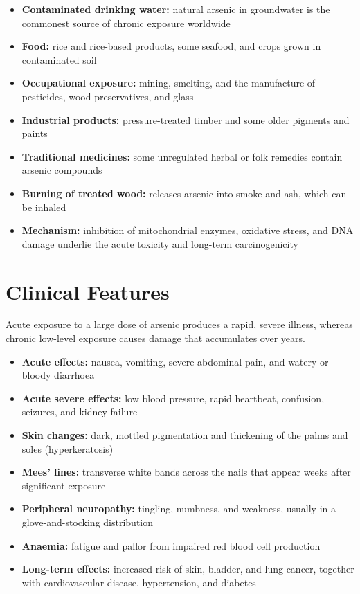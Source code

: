 \begin{itemize}
    \item \textbf{Contaminated drinking water:} natural arsenic in groundwater is the commonest source of chronic exposure worldwide
    \item \textbf{Food:} rice and rice-based products, some seafood, and crops grown in contaminated soil
    \item \textbf{Occupational exposure:} mining, smelting, and the manufacture of pesticides, wood preservatives, and glass
    \item \textbf{Industrial products:} pressure-treated timber and some older pigments and paints
    \item \textbf{Traditional medicines:} some unregulated herbal or folk remedies contain arsenic compounds
    \item \textbf{Burning of treated wood:} releases arsenic into smoke and ash, which can be inhaled
    \item \textbf{Mechanism:} inhibition of mitochondrial enzymes, oxidative stress, and DNA damage underlie the acute toxicity and long-term carcinogenicity
\end{itemize}

\section*{Clinical Features}
Acute exposure to a large dose of arsenic produces a rapid, severe illness, whereas chronic low-level exposure causes damage that accumulates over years.

\begin{itemize}
    \item \textbf{Acute effects:} nausea, vomiting, severe abdominal pain, and watery or bloody diarrhoea
    \item \textbf{Acute severe effects:} low blood pressure, rapid heartbeat, confusion, seizures, and kidney failure
    \item \textbf{Skin changes:} dark, mottled pigmentation and thickening of the palms and soles (hyperkeratosis)
    \item \textbf{Mees' lines:} transverse white bands across the nails that appear weeks after significant exposure
    \item \textbf{Peripheral neuropathy:} tingling, numbness, and weakness, usually in a glove-and-stocking distribution
    \item \textbf{Anaemia:} fatigue and pallor from impaired red blood cell production
    \item \textbf{Long-term effects:} increased risk of skin, bladder, and lung cancer, together with cardiovascular disease, hypertension, and diabetes
\end{itemize}

